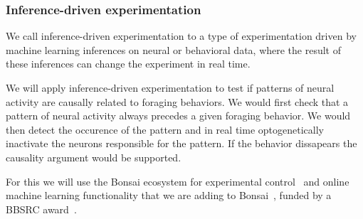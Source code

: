 \subsubsection{Inference-driven experimentation}

We call inference-driven experimentation to a type of experimentation driven by
machine learning inferences on neural or behavioral data, where the result of
these inferences can change the experiment in real time.

We will apply inference-driven experimentation to test if patterns of neural
activity are causally related to foraging behaviors.
%
We would first check that a pattern of neural activity always precedes a given
foraging behavior. We would then detect the occurence of the pattern and in
real time optogenetically inactivate the neurons responsible for the pattern.
%
If the behavior dissapears the causality argument would be supported.

For this we will use the Bonsai ecosystem for experimental
control~\citep{bonsai} and online machine learning functionality that we are
adding to Bonsai~\citep{bonsaiML}, funded by a BBSRC award~\citep{bbsrcAward}.


